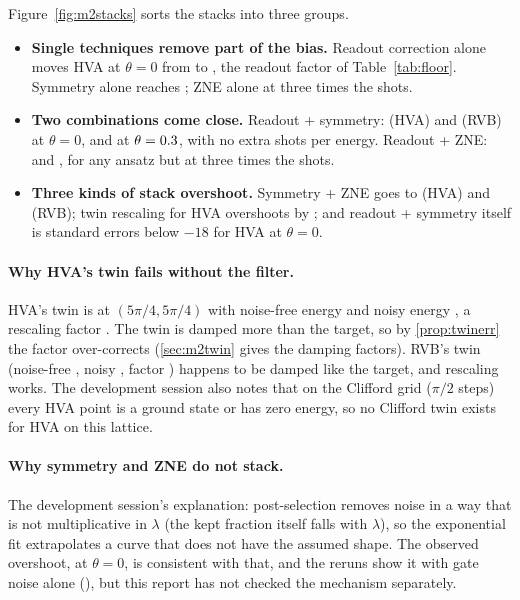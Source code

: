 Figure~\ref{fig:m2stacks} sorts the stacks into three groups.
\begin{itemize}
  \item \textbf{Single techniques remove part of the bias.} Readout correction alone moves HVA at
    $\theta=0$ from \VMtHvaZeroRaw{} to \VMtHvaZeroRo, the readout factor of Table~\ref{tab:floor}.
    Symmetry alone reaches \VMtHvaZeroSym; ZNE alone \VMtHvaZeroZne{} at three times the shots.
  \item \textbf{Two combinations come close.} Readout + symmetry: \VMtHvaZeroRoSymRel{} (HVA) and
    \VMtRvbZeroRoSymRel{} (RVB) at $\theta=0$, \VMtHvaPtRoSymRel{} and \VMtRvbPtRoSymRel{} at
    $\theta=0.3$, with no extra shots per energy. Readout + ZNE: \VMtHvaZeroRoZneRel{}
    and \VMtRvbZeroRoZneRel{}, for any ansatz but at three times the shots.
  \item \textbf{Three kinds of stack overshoot.} Symmetry + ZNE goes to \VMtHvaZeroRoSymZne{} (HVA) and \VMtRvbZeroRoSymZne{} (RVB); twin
    rescaling for HVA overshoots by \VMtHvaZeroTwinRel; and readout + symmetry itself is
    \VMtHvaZeroRoSymBelow{} standard errors below $-18$ for HVA at $\theta=0$.
\end{itemize}

\paragraph{Why HVA's twin fails without the filter.} HVA's twin is at $(5\pi/4,5\pi/4)$ with
noise-free energy \VMtTwinIdealHva{} and noisy energy \VMtTwinNoisyHva, a rescaling factor
\VMtTwinFactorHva. The twin is damped more than the target, so by \cref{prop:twinerr} the
factor over-corrects (\cref{sec:m2twin} gives the damping factors). RVB's twin (noise-free \VMtTwinIdealRvb, noisy \VMtTwinNoisyRvb, factor
\VMtTwinFactorRvb) happens to be damped like the target, and rescaling works. The development
session also notes that on the Clifford grid ($\pi/2$ steps) every HVA point is a ground state
or has zero energy, so no Clifford twin exists for HVA on this lattice.

\paragraph{Why symmetry and ZNE do not stack.} The development session's explanation:
post-selection removes noise in a way that is not multiplicative in $\lambda$ (the kept fraction
itself falls with $\lambda$), so the exponential fit extrapolates a curve that does not have the
assumed shape. The observed overshoot, \VMtHvaZeroRoSymZneRel{} at $\theta=0$, is consistent with
that, and the reruns show it with gate noise alone (\VMbHvaGatesPtRoSymZneRel), but this report
has not checked the mechanism separately.

